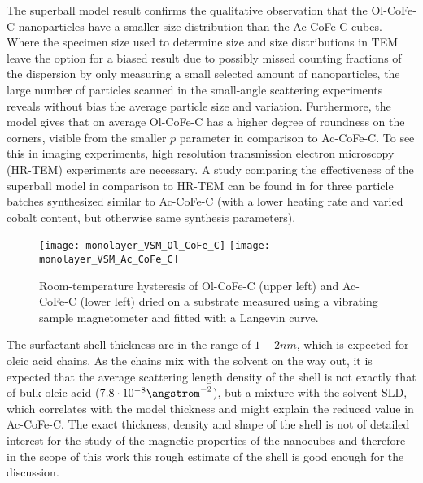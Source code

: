 \documentclass[\main/dresen_thesis.tex]{subfiles}
\begin{document}
    The superball model result confirms the qualitative observation that the Ol-CoFe-C nanoparticles have a smaller size distribution than the Ac-CoFe-C cubes.
    Where the specimen size used to determine size and size distributions in TEM leave the option for a biased result due to possibly missed counting fractions of the dispersion by only measuring a small selected amount of nanoparticles, the large number of particles scanned in the small-angle scattering experiments reveals without bias the average particle size and variation.
    Furthermore, the model gives that on average Ol-CoFe-C has a higher degree of roundness on the corners, visible from the smaller $p$ parameter in comparison to Ac-CoFe-C.
    To see this in imaging experiments, high resolution transmission electron microscopy (HR-TEM) experiments are necessary.
    A study comparing the effectiveness of the superball model in comparison to HR-TEM can be found in  for three particle batches synthesized similar to Ac-CoFe-C (with a lower heating rate and varied cobalt content, but otherwise same synthesis parameters).

    \begin{figure}[tb]
      \centering
      \texttt{[image: monolayer\_VSM\_Ol\_CoFe\_C]}
      \texttt{[image: monolayer\_VSM\_Ac\_CoFe\_C]}
      \caption{\label{fig:monolayers:nanoparticle:vsm}Room-temperature hysteresis of Ol-CoFe-C (upper left) and Ac-CoFe-C (lower left) dried on a substrate measured using a vibrating sample magnetometer and fitted with a Langevin curve.}
    \end{figure}
    The surfactant shell thickness are in the range of $1 - 2 \unit{nm}$, which is expected for oleic acid chains.
    As the chains mix with the solvent on the way out, it is expected that the average scattering length density of the shell is not exactly that of bulk oleic acid ($7.8 \cdot 10^{-8} \angstrom^{-2}$), but a mixture with the solvent SLD, which correlates with the model thickness and might explain the reduced value in Ac-CoFe-C.
    The exact thickness, density and shape of the shell is not of detailed interest for the study of the magnetic properties of the nanocubes and therefore in the scope of this work this rough estimate of the shell is good enough for the discussion.
\end{document}
